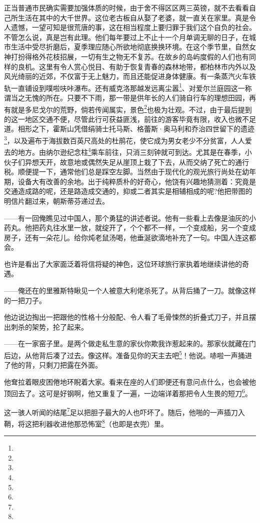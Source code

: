 \par 正当普通市民确实需要加强体质的时候，由于舍不得区区两三英镑，就不去看看自己所生活在其中的大千世界。这位老古板自从娶了老婆，就一直关在家里。真是令人遗憾，一望可知是很荒唐的事，这在相当程度上要归罪于我们这个自负的社会。不管怎么说，真是岂有此理。他们每年要过上不止十一个月单调无聊的日子，在城市生活中受尽折磨后，夏季理应随心所欲地彻底换换环境。在这个季节里，自然女神打扮得格外花枝招展，一切有生之物无不复苏。在故乡的岛屿度假的人们也有同样的良机。这里有令人赏心悦目、有助于恢复青春的森林地带，都柏林市内外以及风光绮丽的近郊，不仅富于无上魅力，而且还能促进身体健康。有一条蒸汽火车铁轨一直铺设到噗啦呋咔瀑布。还有威克洛那越发远离尘嚣\footnote{}、对爱尔兰庭园这一称谓当之无愧的所在。只要不下雨，那一带是供年长的人们骑自行车的理想田园，再有就是多尼戈尔的荒野，倘若传闻属实，景色\footnote{}也极为壮观。不过，由于最后提到的这一地区交通不便，尽管此行可获益匪浅，前往的游客毕竟有限，收入也微不足道。相形之下，霍斯山凭借绢骑士托马斯、格蕾斯·奥马利和乔治四世留下的遗迹\footnote{}，以及遍布于海拔数百英尺高处的杜鹃花，使它成为男女老少不分贫富，人人爱去的地方。由纳尔逊纪念柱\footnote{}乘车前往，只消三刻钟就可到达。尤其是在春季，小伙子们异想天开，故意地或偶然失足从崖顶上栽了下去，从而交纳了死亡的通行税。顺便提一下，通常他们总是踩空左脚。当然由于现代化的观光旅行尚处在幼年期，设备大有改善的余地。出于纯粹质朴的好奇心，他饶有兴趣地猜测着：究竟是交通造成路的呢，还是路造成交通的，抑或二者其实是相辅相成的呢?他把带图的明信片翻过来，朝斯蒂芬递过去。
\par ——有一回俺瞧见过中国人，那个勇猛的讲述者说。他有一些看上去像是油灰的小药丸。他把药丸往水里一放，就绽开了，个个都不一样，一个变成船，另一个变成房子，还有一朵花儿。给你炖老鼠汤喝，他垂涎欲滴地补充了一句。中国人连这都会。
\par 也许是看出了大家面泛着将信将疑的神色，这位环球旅行家执着地继续讲他的奇遇。
\par ——俺还在的里雅斯特瞅见一个人被意大利佬杀死了。从背后捅了一刀。就像这样的一把刀子。
\par 他边说边掏出一把跟他的性格十分般配、令人看了毛骨悚然的折叠式刀子，并且摆出刺杀的架势，抡了起来。
\par ——在一家窑子里。是两个做走私生意的家伙你欺我诈惹起来的。那家伙就藏在门后边，从他背后凑了过去。像这样。准备见你的天主去吧\footnote{}！他说。哧啦一声捅进了他的背，只剩刀把露在外面。
\par 他耷拉着眼皮困倦地环睨着大家。看来在座的人们即便还有意问点什么，也会被他顶回去了。这可是好钢啊，他又重复了一遍，一边端详着那把令人生畏的短刀\footnote{}。
\par 这一骇人听闻的结尾\footnote{}足以把胆子最大的人也吓坏了。随后，他啪的一声插刀入鞘，将这把利器收进他那恐怖室\footnote{}（也即是衣兜）里。
